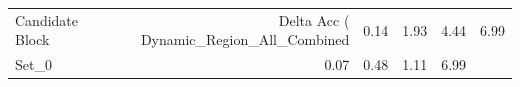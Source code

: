 \begin{tabular}{lrrrr}
\toprule
Candidate Block & Delta Acc (%
\midrule
Dynamic_Region_All_Combined & 0.14 & 1.93 & 4.44 & 6.99 \\
Set_0 & 0.07 & 0.48 & 1.11 & 6.99 \\
\bottomrule
\end{tabular}

